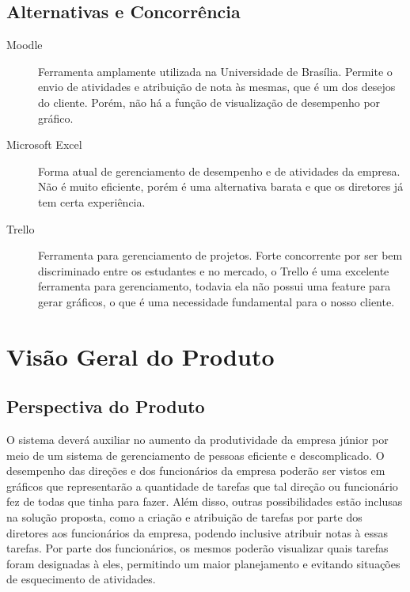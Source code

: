 \begin{apendicesenv}
\subsection{Alternativas e Concorrência}

\begin{description}

\item [Moodle] Ferramenta amplamente utilizada na Universidade de Brasília. Permite o envio de atividades e atribuição de nota às mesmas, que é um dos desejos do cliente. Porém, não há a função de visualização de desempenho por gráfico.

\item [Microsoft Excel] Forma atual de gerenciamento de desempenho e de atividades da empresa. Não é muito eficiente, porém é uma alternativa barata e que os diretores já tem certa experiência.

\item [Trello] Ferramenta para gerenciamento de projetos. Forte concorrente por ser bem discriminado entre os estudantes e no mercado, o Trello é uma excelente ferramenta para gerenciamento, todavia ela não possui uma feature para gerar gráficos, o que é uma necessidade fundamental para o nosso cliente.

\end{description}

\section{Visão Geral do Produto}

\subsection{Perspectiva do Produto}

O sistema deverá auxiliar no aumento da produtividade da empresa júnior por meio de um sistema de gerenciamento de pessoas eficiente e descomplicado. O desempenho das direções e dos funcionários da empresa poderão ser vistos em gráficos que representarão a quantidade de tarefas que tal direção ou funcionário fez de todas que tinha para fazer.
Além disso, outras possibilidades estão inclusas na solução proposta, como a criação e atribuição de tarefas por parte dos diretores aos funcionários da empresa, podendo inclusive atribuir notas à essas tarefas. Por parte dos funcionários, os mesmos poderão visualizar quais tarefas foram designadas à eles, permitindo um maior planejamento e evitando situações de esquecimento de atividades.


\end{apendicesenv}
